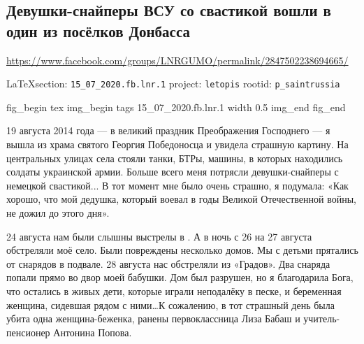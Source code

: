  
 
  
\subsection{Девушки-снайперы ВСУ со свастикой вошли в один из посёлков Донбасса}
\label{sec:15_07_2020.fb.lnr.1}
\url{https://www.facebook.com/groups/LNRGUMO/permalink/2847502238694665/}


\cite{15_07_2020.fb.lnr.1}

\vspace{0.5cm}
{\ifDEBUG\small\LaTeX section: \verb|15_07_2020.fb.lnr.1| project: \verb|letopis| rootid: \verb|p_saintrussia|\fi}
\vspace{0.5cm}

\ifcmt
fig_begin 
	tex \centering
  img_begin 
    tags 15_07_2020.fb.lnr.1
    width 0.5
  img_end
fig_end
\fi



19 августа 2014 года --- в великий праздник Преображения Господнего --- я вышла из
храма святого Георгия Победоносца и увидела страшную картину. На центральных
улицах села стояли танки, БТРы, машины, в которых находились солдаты украинской
армии. Больше всего меня потрясли девушки-снайперы с немецкой свастикой... В
тот момент мне было очень страшно, я подумала: «Как хорошо, что мой дедушка,
который воевал в годы Великой Отечественной войны, не дожил до этого дня».

24 августа нам были слышны выстрелы в . А в ночь с 26 на 27
августа обстреляли моё село. Были повреждены несколько домов. Мы с детьми
прятались от снарядов в подвале. 28 августа нас обстреляли из «Градов». Два
снаряда попали прямо во двор моей бабушки. Дом был разрушен, но я благодарила
Бога, что остались в живых дети, которые играли неподалёку в песке, и
беременная женщина, сидевшая рядом с ними\ldots К сожалению, в тот страшный день
была убита одна женщина-беженка, ранены первоклассница Лиза Бабаш и
учитель-пенсионер Антонина Попова.


